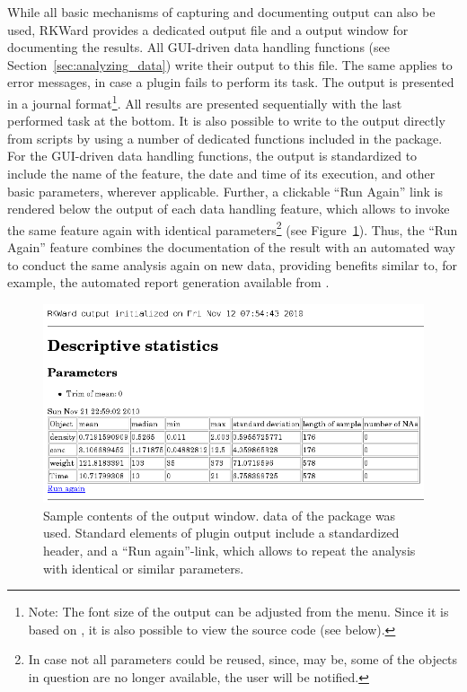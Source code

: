 While all basic mechanisms of
capturing and documenting  output can also
be used, RKWard provides a dedicated output file and a output
window for documenting the results. All GUI-driven data handling
functions (see Section~\ref{sec:analyzing_data}) write their output to this file. 
The same applies to error messages, in case a plugin fails to perform its task.
The output is presented in a journal format\footnote{Note: The font size of the output can be adjusted
from the menu. 
Since it is based on , it is also possible to view the source code 
(see below).}. All results are presented
sequentially with the last performed task at the bottom.
It is also possible to write to the output directly from 
scripts by using a number of dedicated 
functions included in the  package. For the GUI-driven data handling functions, the output is
standardized to include the name of the feature, the date and time of
its execution, and other basic parameters, wherever
applicable. Further, a clickable ``Run
Again'' link is rendered below the output of each data
handling feature, which allows to invoke the same feature again with
identical parameters\footnote{In case not all parameters could be
reused, since, may be, some of the objects in
question are no longer available, the user will be notified.} (see
Figure~\ref{fig:results_output}). Thus, the ``Run
Again'' feature combines the documentation of the result
with an automated way to conduct the same analysis again on new
data, providing benefits similar to, for example, the automated report generation
available from  \citep{RaffelsbergerW2008}.


\begin{figure}[htp]
 \centering
 \includegraphics[width=15.5cm]{../figures/results_output_cropped.png}
 \caption{Sample contents of the output window.  data of the  package was used. 
  Standard elements of plugin output include a standardized header, and a 
  ``Run again''-link, which allows to repeat the analysis with identical or 
  similar parameters.}
 \label{fig:results_output}
\end{figure}

